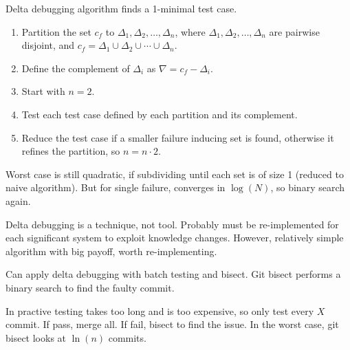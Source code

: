 \documentclass[11pt]{article}
\begin{document}
Delta debugging algorithm finds a 1-minimal test case.
\begin{enumerate}
\item Partition the set \(c_{f}\) to \(\Delta_{1}, \Delta_{2}, \dots, \Delta_{n}\),
where \(\Delta_{1}, \Delta_{2}, \dots, \Delta_{n}\) are pairwise disjoint, and
\(c_{f} = \Delta_{1} \cup \Delta_{2} \cup \cdots \cup \Delta_{n}\).
\item Define the complement of \(\Delta_{i}\) as \(\nabla = c_{f} - \Delta_{i}\).
\item Start with \(n = 2\).
\item Test each test case defined by each partition and its complement.
\item Reduce the test case if a smaller failure inducing set is found, otherwise it refines the
partition, so \(n = n \cdot 2\).
\end{enumerate}

Worst case is still quadratic, if subdividing until each set is of size 1 (reduced to naive
algorithm). But for single failure, converges in \(\log(N)\), so binary search again.

Delta debugging is a technique, not tool.
Probably must be re-implemented for each significant system to exploit knowledge changes.
However, relatively simple algorithm with big payoff, worth re-implementing.

Can apply delta debugging with batch testing and bisect.
Git bisect performs a binary search to find the faulty commit.

In practive testing takes too long and is too expensive, so only test every \(X\) commit.
If pass, merge all. If fail, bisect to find the issue.
In the worst case, git bisect looks at \(\ln(n)\) commits.
\end{document}
